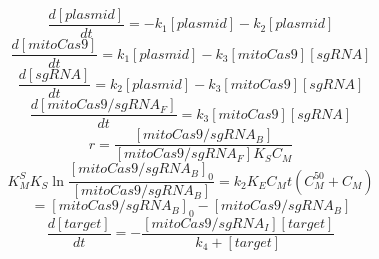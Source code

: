 \begin{equation}
\frac{d[plasmid]}{dt}=-k_1[plasmid]-k_2[plasmid]\tag{1}
\end{equation}
\begin{equation}
\frac{d[mitoCas9]}{dt}=k_1[plasmid]-k_3[mitoCas9][sgRNA]\tag{2}
\end{equation}
\begin{equation}
\frac{d[sgRNA]}{dt}=k_2[plasmid]-k_3[mitoCas9][sgRNA]\tag{3}
\end{equation}
\begin{equation}
\frac{d[mitoCas9/sgRNA_F]}{dt}=k_3[mitoCas9][sgRNA]\tag{4}
\end{equation}
\begin{equation}
 r=\frac{[mitoCas9/sgRNA_B]}{[mitoCas9/sgRNA_F]K_S C_M}\tag{5}
\end{equation}
\begin{equation}
K_M^SK_S\ln\frac{[mitoCas9/sgRNA_B]_0}{[mitoCas9/sgRNA_B]}=k_2K_EC_Mt (C_M^{50}+C_M)\tag{6}
\end{equation}
\begin{equation}
 [mitoCas9/sgRNA_I]= [mitoCas9/sgRNA_B]_0-[mitoCas9/sgRNA_B]\tag{7}
\end{equation}
\begin{equation}
\frac{d[target]}{dt}=-\frac{[mitoCas9/sgRNA_I][target]}{k_4+[target]}\tag{8}
\end{equation}

